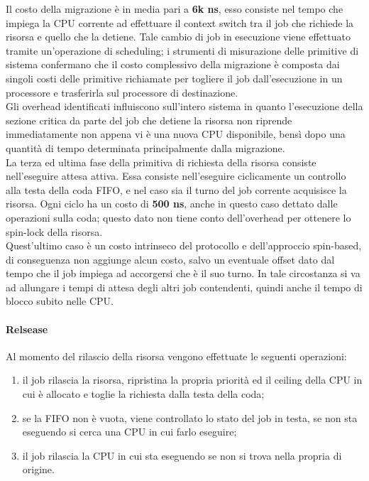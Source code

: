 \noindent Il costo della migrazione è in media pari a \textbf{6k ns}, esso consiste nel tempo che impiega la CPU corrente ad effettuare il context switch tra il job che richiede la risorsa e quello che la detiene. Tale cambio di job in esecuzione viene effettuato tramite un'operazione di scheduling; i strumenti di misurazione delle primitive di sistema confermano che il costo complessivo della migrazione è composta dai singoli costi delle primitive richiamate per togliere il job dall'esecuzione in un processore e trasferirla sul processore di destinazione.\\

\noindent Gli overhead identificati influiscono sull'intero sistema in quanto l'esecuzione della sezione critica da parte del job che detiene la risorsa non riprende immediatamente non appena vi è una nuova CPU disponibile, bensì dopo una quantità di tempo determinata principalmente dalla migrazione.\\

\noindent La terza ed ultima fase della primitiva di richiesta della risorsa consiste nell'eseguire attesa attiva. Essa consiste nell'eseguire ciclicamente un controllo alla testa della coda FIFO, e nel caso sia il turno del job corrente acquisisce la risorsa. Ogni ciclo ha un costo di \textbf{500 ns}, anche in questo caso dettato dalle operazioni sulla coda; questo dato non tiene conto dell'overhead per ottenere lo spin-lock della risorsa.\\

\noindent Quest'ultimo caso è un costo intrinseco del protocollo e dell'approccio spin-based, di conseguenza non aggiunge alcun costo, salvo un eventuale offset dato dal tempo che il job impiega ad accorgersi che è il suo turno. In tale circostanza si va ad allungare i tempi di attesa degli altri job contendenti, quindi anche il tempo di blocco subito nelle CPU.\\

\paragraph{Relsease} Al momento del rilascio della risorsa vengono effettuate le seguenti operazioni:

\begin{enumerate}
	\item il job rilascia la risorsa, ripristina la propria priorità ed il ceiling della CPU in cui è allocato e toglie la richiesta dalla testa della coda;
	\item se la FIFO non è vuota, viene controllato lo stato del job in testa, se non sta eseguendo si cerca una CPU in cui farlo eseguire;
	\item il job rilascia la CPU in cui sta eseguendo se non si trova nella propria di origine.
\end{enumerate}

